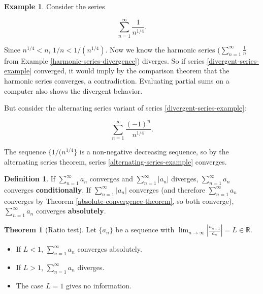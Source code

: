 \documentclass{article}
\theoremstyle{definition}
\newtheorem{definition}{Definition}[section]
\newtheorem{example}{Example}[section]
\newtheorem{theorem}{Theorem}[section]
\begin{document}
\begin{example}
Consider the series

\begin{equation} \label{divergent-series-example}
\sum\limits_{n=1}^\infty \frac{1}{n^{1/4}}.
\end{equation}

Since $n^{1/4} < n$, $1/n < 1/(n^{1/4})$. Now we know the harmonic series ($\sum\limits_{n=1}^\infty \frac{1}{n}$ from Example \ref{harmonic-series-divergence}) diverges. So if series \ref{divergent-series-example} converged, it would imply by the comparison theorem that the harmonic series converges, a contradiction. Evaluating partial sums on a computer also shows the divergent behavior.

But consider the alternating series variant of series \ref{divergent-series-example}:

\begin{equation*} \label{alternating-series-example}
\sum\limits_{n=1}^\infty \frac{(-1)^n}{n^{1/4}}.
\end{equation*}

The sequence $\{1/(n^{1/4}\}$ is a non-negative decreasing sequence, so by the alternating series theorem, series \ref{alternating-series-example} converges.
\end{example}

\begin{definition}
If  $\sum\limits_{n=1}^\infty a_n$ converges and  $\sum\limits_{n=1}^\infty |a_n|$ diverges,  $\sum\limits_{n=1}^\infty a_n$ converges \textbf{conditionally}. If  $\sum\limits_{n=1}^\infty |a_n|$ converges (and therefore  $\sum\limits_{n=1}^\infty a_n$ converges by Theorem \ref{absolute-convergence-theorem}, so both converge), $\sum\limits_{n=1}^\infty a_n$ converges \textbf{absolutely}.
\end{definition}

\begin{theorem}[Ratio test]
Let $\{a_n\}$ be a sequence with $\lim_{n \to \infty} |\frac{a_{n+1}}{a_n}| = L \in \mathbb{R}$.

\begin{itemize}
\item If $L < 1$, $\sum\limits_{n=1}^\infty a_n$ converges absolutely.
\item If $L > 1$, $\sum\limits_{n=1}^\infty a_n$ diverges.
\item The case $L = 1$ gives no information.
\end{itemize}
\end{theorem}
\end{document}
